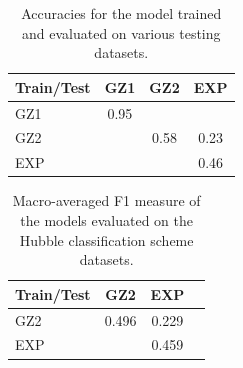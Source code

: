 \documentclass{article}
\begin{document}
\begin{table}
\begin{center}
\begin{tabular}{l|c|c|c}
Train/Test	&	GZ1		&	GZ2		&	EXP		\\ \hline
GZ1			&	0.95	&			&			\\
GZ2			&			&	0.58	&	0.23	\\
EXP			&			&			&	0.46
\end{tabular}
\end{center}
\caption{Accuracies for the model trained and evaluated on various testing datasets.}
\end{table}

\begin{table}
\begin{center}
\begin{tabular}{l|c|c|c}
Train/Test	&	GZ2		&	EXP			\\ \hline
GZ2			&	0.496	&	0.229		\\
EXP			&			&	0.459
\end{tabular}
\end{center}
\caption{Macro-averaged F1 measure of the models evaluated on the Hubble classification scheme datasets.}
\end{table}
\end{document}

